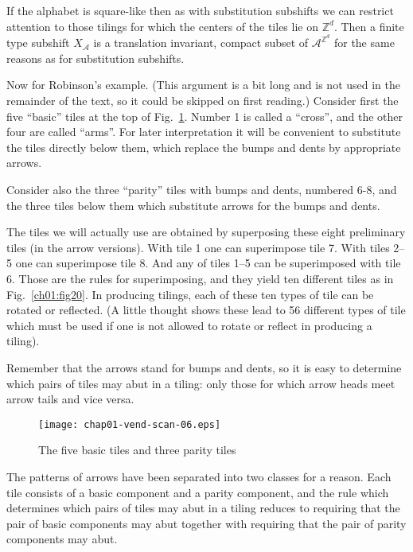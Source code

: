 \documentclass[reqno]{stml-l}
\theoremstyle{plain}
\theoremstyle{definition}
\numberwithin{equation}{chapter}
\begin{document}
If the alphabet is square-like then as with substitution subshifts we can restrict attention to those tilings for which the centers of the tiles lie on $\mathbb{Z}^{d}$. Then a finite type subshift $X_{\mathcal{A}}$ is a translation invariant, compact subset of $\mathcal{A}^{\mathbb{Z}^{d}}$ for the same reasons as for substitution subshifts.

Now for Robinson's example. (This argument is a bit long and is not used in the remainder of the text, so it could be skipped on first reading.) Consider first the five ``basic'' tiles at the top of Fig.~\ref{ch01:fig19}. Number 1 is called a ``cross'', and the other four are called ``arms''. For later interpretation it will be convenient to substitute the tiles directly below them, which replace the bumps and dents by appropriate arrows.

Consider also the three ``parity'' tiles with bumps and dents, numbered 6-8, and the three tiles below them which substitute arrows for the bumps and dents.

The tiles we will actually use are obtained by superposing these eight preliminary tiles (in the arrow versions). With tile 1 one can superimpose tile 7. With tiles 2--5 one can superimpose tile 8. And any of tiles 1--5 can be superimposed with tile 6. Those are the rules for superimposing, and they yield ten different tiles as in Fig.~\ref{ch01:fig20}. In producing tilings, each of these ten types of tile can be rotated or reflected. (A little thought shows these lead to 56 different types of tile which must be used if one is not allowed to rotate or reflect in producing a tiling).

Remember that the arrows stand for bumps and dents, so it is easy to determine which pairs of tiles may abut in a tiling: only those for which arrow heads meet arrow tails and vice versa.

\begin{figure}[!h]
\texttt{[image: chap01-vend-scan-06.eps]}
\caption{The five basic tiles and three parity tiles
}\label{ch01:fig19}
\end{figure}

 The patterns of arrows have been separated into two classes for a reason. Each tile consists of a basic component and a parity component, and the rule which determines which pairs of tiles may abut in a tiling reduces to requiring that the pair of basic components may abut together with requiring that the pair of parity components may abut.
\end{document}
